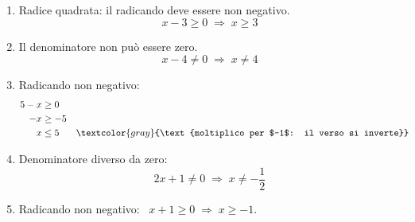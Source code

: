 \begin{question}[ID=1.1, subtitle={Determinazione del dominio di una funzione}, difficulty=facile, tags={funzioni, dominio}]
\begin{explanation}
\begin{enumerate}
    \item Radice quadrata: il radicando deve essere non negativo.
    \[ x-3\geq 0 \;\Rightarrow\; x\geq 3 \]
    \item Il denominatore non può essere zero.
    \[ x-4\neq 0 \;\Rightarrow\; x\neq 4 \]
    \item Radicando non negativo:
    \[\begin{aligned}
    5-x &\geq 0\\
    -x &\geq -5\\
    x &\leq 5 && \textcolor{gray}{\text{moltiplico per $-1$: il verso si inverte}}
    \end{aligned}\]
    \item Denominatore diverso da zero:
    \[ 2x+1\neq 0 \;\Rightarrow\; x\neq -\dfrac12 \]
    \item Radicando non negativo: \ $x+1\geq 0 \;\Rightarrow\; x\geq -1$.
\end{enumerate}
\end{explanation}
\end{question}


